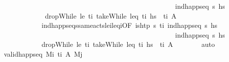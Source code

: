 \begin{isabellebody}
\ \ \ \ \ \ \ \ \ \ \ \ \ \ \ \ \ \ \ \ \ \ \ \ \ \ \ \ \ \ \ \ \ \ \ \ \ \ \ \ \ \ \ \ \ \ \ \ \ \ \ {\isacartoucheopen}ind{\isacharunderscore}{\kern0pt}happ{\isacharunderscore}{\kern0pt}seq\ {\isasympi}s\ hs\isanewline
\ \ \ \ \ \ \ \ \ \ \ \ \ {\isacartoucheopen}dropWhile\ {\isacharparenleft}{\kern0pt}le\ t\isactrlsub i{\isacharparenright}{\kern0pt}\ {\isacharparenleft}{\kern0pt}takeWhile\ {\isacharparenleft}{\kern0pt}leq\ t\isactrlsub i{\isacharparenright}{\kern0pt}\ hs\ {\isacharequal}{\kern0pt}\ {\isacharbrackleft}{\kern0pt}{\isacharparenleft}{\kern0pt}t\isactrlsub i{\isacharcomma}{\kern0pt}\ A\isanewline
\ \ \ \ \ \ \ \ \ \ \ \ ind{\isacharunderscore}{\kern0pt}happ{\isacharunderscore}{\kern0pt}seqs{\isacharunderscore}{\kern0pt}same{\isacharunderscore}{\kern0pt}acts{\isacharunderscore}{\kern0pt}le\isactrlsub i{\isacharunderscore}{\kern0pt}leq\isactrlsub i{\isacharbrackleft}{\kern0pt}OF\ {\isacartoucheopen}is{\isacharunderscore}{\kern0pt}htp\ {\isasympi}s\ t\isactrlsub i{\isacartoucheclose}\ {\isacartoucheopen}ind{\isacharunderscore}{\kern0pt}happ{\isacharunderscore}{\kern0pt}seq\ {\isasympi}s\ hs\isanewline
\ \ \ \ \ \ \ \ \ \ \ \ \ \ \ \ \ \ \ \ \ \ \ \ \ \ \ \ \ \ \ \ \ \ \ \ \ \ \ \ \ \ \ \ \ \ \ \ \ \ \ {\isacartoucheopen}ind{\isacharunderscore}{\kern0pt}happ{\isacharunderscore}{\kern0pt}seq\ {\isasympi}s\ hs\isanewline
\ \ \ \ \ \ \ \ \ \ \ \ {\isacartoucheopen}dropWhile\ {\isacharparenleft}{\kern0pt}le\ t\isactrlsub i{\isacharparenright}{\kern0pt}\ {\isacharparenleft}{\kern0pt}takeWhile\ {\isacharparenleft}{\kern0pt}leq\ t\isactrlsub i{\isacharparenright}{\kern0pt}\ hs\ {\isacharequal}{\kern0pt}\ {\isacharbrackleft}{\kern0pt}{\isacharparenleft}{\kern0pt}t\isactrlsub i{\isacharcomma}{\kern0pt}\ A\isanewline
\ \ \ \ \ \ \isamarkupfalse%
\ auto\isanewline
\ \ \ \ \isamarkupfalse%
\ {\isachardoublequoteopen}valid{\isacharunderscore}{\kern0pt}happ{\isacharunderscore}{\kern0pt}seq\ M\isactrlsub i\ {\isacharbrackleft}{\kern0pt}{\isacharparenleft}{\kern0pt}t\isactrlsub i{\isacharcomma}{\kern0pt}\ A\ M\isactrlsub j{\isachardoublequoteclose}\isanewline

\end{isabellebody}
